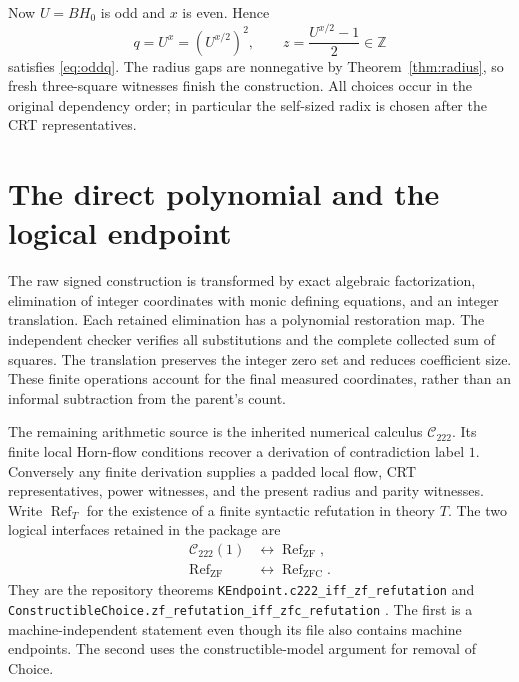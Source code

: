 \documentclass[11pt]{article}
\newcommand{\Z}{\mathbb Z}
\newcommand{\ZFC}{\mathrm{ZFC}}
\newcommand{\ZF}{\mathrm{ZF}}
\newcommand{\code}[1]{\nolinkurl{#1}}
\theoremstyle{remark}
\numberwithin{equation}{section}
\begin{document}
Now $U=BH_0$ is odd and $x$ is even. Hence
\[
q=U^x=(U^{x/2})^2,
\qquad z=\frac{U^{x/2}-1}{2}\in\Z
\]
satisfies \eqref{eq:oddq}. The radius gaps are nonnegative by Theorem~\ref{thm:radius}, so fresh three-square witnesses finish the construction. All choices occur in the original dependency order; in particular the self-sized radix is chosen after the CRT representatives.

\section{The direct polynomial and the logical endpoint}\label{sec:logical}

The raw signed construction is transformed by exact algebraic factorization, elimination of integer coordinates with monic defining equations, and an integer translation. Each retained elimination has a polynomial restoration map. The independent checker verifies all substitutions and the complete collected sum of squares. The translation preserves the integer zero set and reduces coefficient size. These finite operations account for the final measured \SignedVariables{} coordinates, rather than an informal subtraction from the parent's count.

The remaining arithmetic source is the inherited numerical calculus $\mathcal C_{222}$. Its finite local Horn-flow conditions recover a derivation of contradiction label $1$. Conversely any finite derivation supplies a padded local flow, CRT representatives, power witnesses, and the present radius and parity witnesses. Write $\operatorname{Ref}_{T}$ for the existence of a finite syntactic refutation in theory $T$. The two logical interfaces retained in the package are
\begin{align*}
\mathcal C_{222}(1)&\longleftrightarrow\operatorname{Ref}_{\ZF},\\
\operatorname{Ref}_{\ZF}&\longleftrightarrow\operatorname{Ref}_{\ZFC}.
\end{align*}
They are the repository theorems \code{KEndpoint.c222_iff_zf_refutation} and \code{ConstructibleChoice.zf_refutation_iff_zfc_refutation} \cite{endpoint,choice}. The first is a machine-independent statement even though its file also contains machine endpoints. The second uses the constructible-model argument for removal of Choice.
\end{document}
